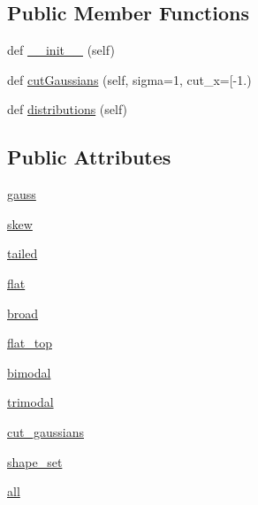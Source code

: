 \subsection*{Public Member Functions}
\begin{DoxyCompactItemize}
\item 
def \mbox{\hyperlink{classgetdist__tests_1_1test__distributions_1_1Test1DDistributions_a4c2eb9700f97c809d0b3288a73026eb9}{\+\_\+\+\_\+init\+\_\+\+\_\+}} (self)
\item 
def \mbox{\hyperlink{classgetdist__tests_1_1test__distributions_1_1Test1DDistributions_a715fb427001858ea3a708d75557a6271}{cut\+Gaussians}} (self, sigma=1, cut\+\_\+x=\mbox{[}-\/1.)
\item 
def \mbox{\hyperlink{classgetdist__tests_1_1test__distributions_1_1Test1DDistributions_a639d76c8f0554536002fb2bd8745ef3a}{distributions}} (self)
\end{DoxyCompactItemize}
\subsection*{Public Attributes}
\begin{DoxyCompactItemize}
\item 
\mbox{\hyperlink{classgetdist__tests_1_1test__distributions_1_1Test1DDistributions_a9172faca4e38d4c971ad6683ac524134}{gauss}}
\item 
\mbox{\hyperlink{classgetdist__tests_1_1test__distributions_1_1Test1DDistributions_ae566ad399045c42fea26c0e2c5bd98c4}{skew}}
\item 
\mbox{\hyperlink{classgetdist__tests_1_1test__distributions_1_1Test1DDistributions_ad8745f8cebf6f4f7e6f18b2d8f047d4b}{tailed}}
\item 
\mbox{\hyperlink{classgetdist__tests_1_1test__distributions_1_1Test1DDistributions_ad4d18096b9bdb8930b8ba71d0c9ac509}{flat}}
\item 
\mbox{\hyperlink{classgetdist__tests_1_1test__distributions_1_1Test1DDistributions_a14a7dee76f9286c84de87ee6a39b185c}{broad}}
\item 
\mbox{\hyperlink{classgetdist__tests_1_1test__distributions_1_1Test1DDistributions_acafca1486a05da80650fc80d4f7b896e}{flat\+\_\+top}}
\item 
\mbox{\hyperlink{classgetdist__tests_1_1test__distributions_1_1Test1DDistributions_afe5fd69b1b8af1a014ba9de69a385694}{bimodal}}
\item 
\mbox{\hyperlink{classgetdist__tests_1_1test__distributions_1_1Test1DDistributions_a39fbba0910db51a9ea6d0cfb2f6cd5c4}{trimodal}}
\item 
\mbox{\hyperlink{classgetdist__tests_1_1test__distributions_1_1Test1DDistributions_a9311a510bc3d301230ecc2089da702cd}{cut\+\_\+gaussians}}
\item 
\mbox{\hyperlink{classgetdist__tests_1_1test__distributions_1_1Test1DDistributions_a497c9be6b30b61cb66b4e8df8cffe75c}{shape\+\_\+set}}
\item 
\mbox{\hyperlink{classgetdist__tests_1_1test__distributions_1_1Test1DDistributions_aeabb6d75550835d5a8c0e84f7906c396}{all}}
\end{DoxyCompactItemize}


